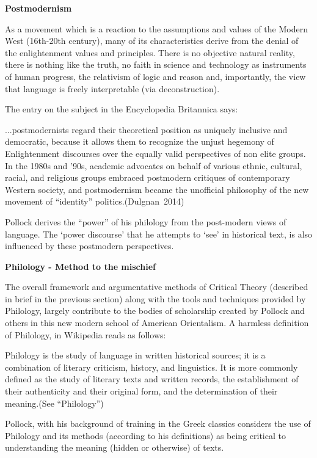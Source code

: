 {\bf Postmodernism}

As a movement which is a reaction to the assumptions and values of the Modern West (16th-20th century), many of its characteristics derive from the denial of the enlightenment values and principles. There is no objective natural reality, there is nothing like the truth, no faith in science and technology as instruments of human progress, the relativism of logic and reason and, importantly, the view that language is freely interpretable (via deconstruction). 

The entry on the subject in the Encyclopedia Britannica says:
\begin{myquote}
...postmodernists regard their theoretical position as uniquely inclusive and democratic, because it allows them to recognize the unjust hegemony of Enlightenment discourses over the equally valid perspectives of non elite groups. In the 1980s and '90s, academic advocates on behalf of various ethnic, cultural, racial, and religious groups embraced postmodern critiques of contemporary Western society, and postmodernism became the unofficial philosophy of the new movement of ``identity'' politics.\hfill \hbox{(Dulgnan 2014)}
\end{myquote}

Pollock derives the ``power'' of his philology from the post-modern views of language. The `power discourse' that he attempts to `see' in historical text, is also influenced by these postmodern perspectives.

{\bf Philology - Method to the mischief}

The overall framework and argumentative methods of Critical Theory (described in brief in the previous section) along with the tools and techniques provided by Philology, largely contribute to the bodies of scholarship created by Pollock and others in this new modern school of American Orientalism. A harmless definition of Philology, in Wikipedia reads as follows:
\begin{myquote}
Philology is the study of language in written historical sources; it is a combination of literary criticism, history, and linguistics. It is more commonly defined as the study of literary texts and written records, the establishment of their authenticity and their original form, and the determination of their meaning.\hfill (See ``Philology'')
\end{myquote}

Pollock, with his background of training in the Greek classics considers the use of Philology and its methods (according to his definitions) as being critical to understanding the meaning (hidden or otherwise) of texts.

